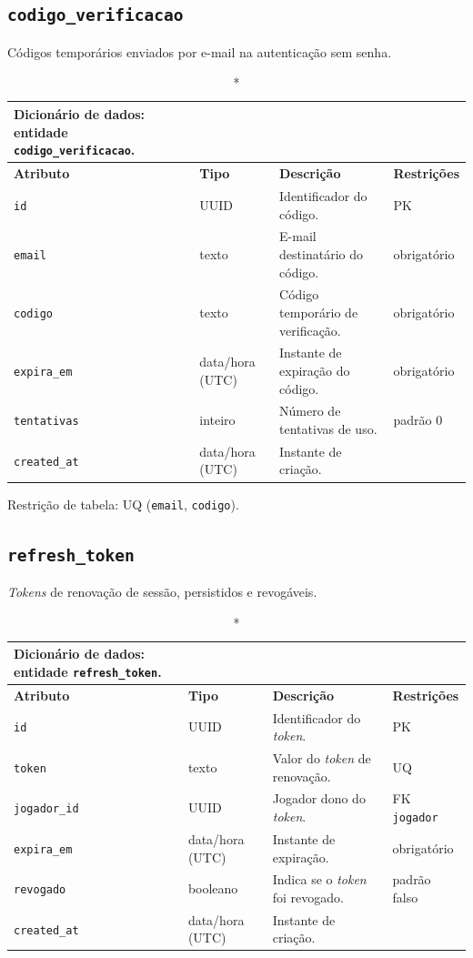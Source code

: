 \begin{apendicesenv}
    \subsection*{\texttt{codigo\_verificacao}}
    Códigos temporários enviados por e-mail na autenticação sem senha.
    \begin{longtable}{p{2.5cm}p{2.1cm}p{5.8cm}p{2.9cm}}
    \caption*{Dicionário de dados: entidade \texttt{codigo\_verificacao}.}\\
        \hline
        \textbf{Atributo} & \textbf{Tipo} & \textbf{Descrição} & \textbf{Restrições} \\
        \hline
        \endhead
        \texttt{id} & UUID & Identificador do código. & PK \\
        \texttt{email} & texto & E-mail destinatário do código. & obrigatório \\
        \texttt{codigo} & texto & Código temporário de verificação. & obrigatório \\
        \texttt{expira\_em} & data/hora (UTC) & Instante de expiração do código. & obrigatório \\
        \texttt{tentativas} & inteiro & Número de tentativas de uso. & padrão 0 \\
        \texttt{created\_at} & data/hora (UTC) & Instante de criação. & \\
        \hline
    \end{longtable}
    \noindent Restrição de tabela: UQ (\texttt{email}, \texttt{codigo}).

    \subsection*{\texttt{refresh\_token}}
    \textit{Tokens} de renovação de sessão, persistidos e revogáveis.
    \begin{longtable}{p{2.5cm}p{2.1cm}p{5.8cm}p{2.9cm}}
    \caption*{Dicionário de dados: entidade \texttt{refresh\_token}.}\\
        \hline
        \textbf{Atributo} & \textbf{Tipo} & \textbf{Descrição} & \textbf{Restrições} \\
        \hline
        \endhead
        \texttt{id} & UUID & Identificador do \textit{token}. & PK \\
        \texttt{token} & texto & Valor do \textit{token} de renovação. & UQ \\
        \texttt{jogador\_id} & UUID & Jogador dono do \textit{token}. & FK \texttt{jogador} \\
        \texttt{expira\_em} & data/hora (UTC) & Instante de expiração. & obrigatório \\
        \texttt{revogado} & booleano & Indica se o \textit{token} foi revogado. & padrão falso \\
        \texttt{created\_at} & data/hora (UTC) & Instante de criação. & \\
        \hline
    \end{longtable}


\end{apendicesenv}
